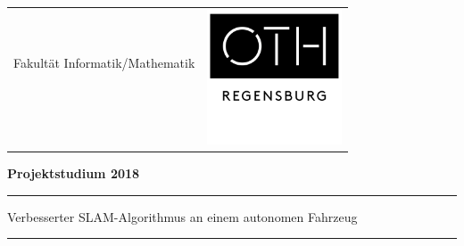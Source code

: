 

\titlepage

\begin{center}

\begin{tabular}{cc}
& \multirow{5}{*}{
\includegraphics[height=4.0cm]{images/cover_sheet/OTH_Regensburg_neues_Logo_01}}\tabularnewline

{\large{}Fakultät Informatik/Mathematik}\hspace{1.5cm} & \tabularnewline
 & \tabularnewline
 & \tabularnewline
 & \tabularnewline
\end{tabular}
\par\end{center}

\noindent 
\vspace{0.7cm}


\noindent \begin{center}
\textbf{\huge{}Projektstudium 2018}
\par\end{center}{\Large \par}


\noindent
\rule{\textwidth}{0.3pt}
\vspace{0.01cm}

\begin{doublespace}
\noindent \begin{center}
{\Large{Verbesserter SLAM-Algorithmus an einem autonomen Fahrzeug}}
\par\end{center}{\large \par}
\end{doublespace}
\noindent\rule{\textwidth}{0.3pt}


\vspace{0.9cm}

\vspace{1.0cm}


